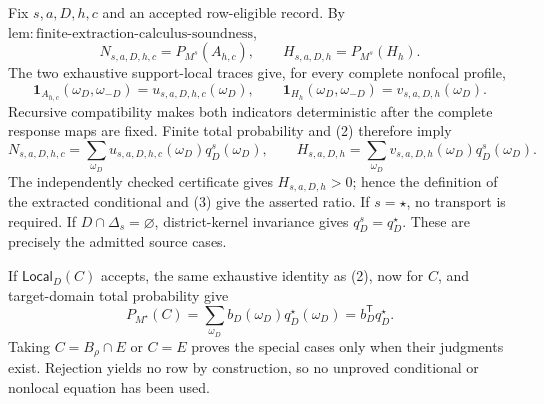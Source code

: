 Fix \(s,a,D,h,c\) and an accepted row-eligible record.  By \(\mathrm{lem:finite\text{-}extraction\text{-}calculus\text{-}soundness}\),
\[
N_{s,a,D,h,c}=P_{M^s}(A_{h,c}),\qquad
H_{s,a,D,h}=P_{M^s}(H_h).
\tag{1}
\]
The two exhaustive support-local traces give, for every complete nonfocal profile,
\[
\mathbf1_{A_{h,c}}(\omega_D,\omega_{-D})=u_{s,a,D,h,c}(\omega_D),\qquad
\mathbf1_{H_h}(\omega_D,\omega_{-D})=v_{s,a,D,h}(\omega_D).
\tag{2}
\]
Recursive compatibility makes both indicators deterministic after the complete response maps are fixed.  Finite total probability and (2) therefore imply
\[
N_{s,a,D,h,c}=\sum_{\omega_D}u_{s,a,D,h,c}(\omega_D)q_D^s(\omega_D),\qquad
H_{s,a,D,h}=\sum_{\omega_D}v_{s,a,D,h}(\omega_D)q_D^s(\omega_D).
\tag{3}
\]
The independently checked certificate gives \(H_{s,a,D,h}>0\); hence the definition of the extracted conditional and (3) give the asserted ratio.  If \(s=\star\), no transport is required.  If \(D\cap\Delta_s=\varnothing\), district-kernel invariance gives \(q_D^s=q_D^\star\).  These are precisely the admitted source cases.

If \(\mathsf{Local}_D(C)\) accepts, the same exhaustive identity as (2), now for \(C\), and target-domain total probability give
\[
P_{M^\star}(C)=\sum_{\omega_D}b_D(\omega_D)q_D^\star(\omega_D)=b_D^{\mathsf T}q_D^\star.
\tag{4}
\]
Taking \(C=B_\rho\cap E\) or \(C=E\) proves the special cases only when their judgments exist.  Rejection yields no row by construction, so no unproved conditional or nonlocal equation has been used.